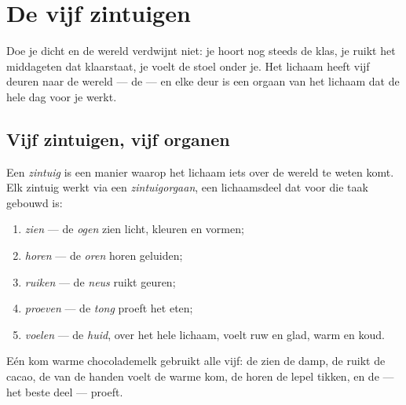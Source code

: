 \chapter{De vijf zintuigen}\label{ch:g1:the-five-senses}

Doe je  dicht en de wereld verdwijnt niet: je hoort nog steeds de
klas, je ruikt het middageten dat klaarstaat, je voelt de stoel onder
je. Het lichaam heeft vijf deuren naar de wereld --- de  ---
en elke deur is een orgaan van het lichaam dat de hele dag voor je werkt.

\section{Vijf zintuigen, vijf organen}

\begin{definition}\label{def:g1:the-five-senses:sense}
Een \emph{zintuig} is een manier waarop het lichaam iets
over de wereld te weten komt. Elk zintuig werkt via een
\emph{zintuigorgaan}, een lichaamsdeel dat voor
die taak gebouwd is:
\begin{enumerate}
  \item \emph{zien} --- de \emph{ogen} zien
        licht, kleuren en vormen;
  \item \emph{horen} --- de \emph{oren} horen
        geluiden;
  \item \emph{ruiken} --- de \emph{neus}
        ruikt geuren;
  \item \emph{proeven} --- de \emph{tong}
        proeft het eten;
  \item \emph{voelen} --- de \emph{huid},
        over het hele lichaam, voelt ruw en glad, warm en koud.
\end{enumerate}
\end{definition}

\begin{example}\label{ex:g1:the-five-senses:breakfast}
Eén kom warme chocolademelk gebruikt alle vijf: de  zien de damp,
de  ruikt de cacao, de  van de handen voelt de warme kom, de
 horen de lepel tikken, en de  --- het beste deel --- proeft.
\end{example}

